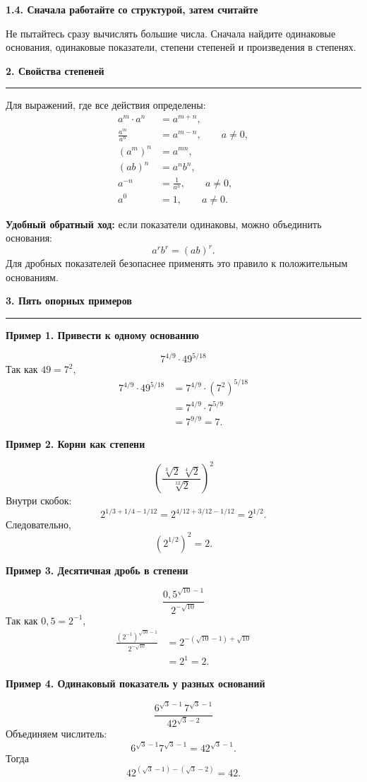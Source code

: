 \documentclass[a4paper,12pt]{article}
\newcommand{\sectionline}{\par\vspace{2pt}\noindent\color{rulegray}\rule{\linewidth}{0.5pt}\color{textgray}\par\vspace{5pt}}
\newcommand{\formula}[1]{\[\displaystyle #1\]}
\newcommand{\markrule}[1]{\textcolor{accent}{\textbf{#1}}}
\newcommand{\exhead}[1]{\par\medskip\textcolor{darkaccent}{\textbf{#1}}\par}
\begin{document}
\exhead{1.4. Сначала работайте со структурой, затем считайте}
Не пытайтесь сразу вычислять большие числа. Сначала найдите одинаковые основания, одинаковые показатели, степени степеней и произведения в степенях.

\vspace{5pt}
{\LARGE\bfseries\color{darkaccent}2. Свойства степеней}\par
\sectionline

Для выражений, где все действия определены:
\begin{align*}
a^m\cdot a^n&=a^{m+n},\\
\frac{a^m}{a^n}&=a^{m-n},\qquad a\ne 0,\\
(a^m)^n&=a^{mn},\\
(ab)^n&=a^n b^n,\\
a^{-n}&=\frac1{a^n},\qquad a\ne0,\\
a^0&=1,\qquad a\ne0.
\end{align*}

\markrule{Удобный обратный ход:} если показатели одинаковы, можно объединить основания:
\formula{a^r b^r=(ab)^r.}
Для дробных показателей безопаснее применять это правило к положительным основаниям.

{\LARGE\bfseries\color{darkaccent}3. Пять опорных примеров}\par
\sectionline

\exhead{Пример 1. Привести к одному основанию}
\formula{7^{4/9}\cdot49^{5/18}}
Так как $49=7^2$,
\begin{align*}
7^{4/9}\cdot49^{5/18}
&=7^{4/9}\cdot(7^2)^{5/18}\\
&=7^{4/9}\cdot7^{5/9}\\
&=7^{9/9}=7.
\end{align*}

\exhead{Пример 2. Корни как степени}
\formula{\left(\frac{\sqrt[3]{2}\,\sqrt[4]{2}}{\sqrt[12]{2}}\right)^2}
Внутри скобок:
\formula{2^{1/3+1/4-1/12}=2^{4/12+3/12-1/12}=2^{1/2}.}
Следовательно,
\formula{\left(2^{1/2}\right)^2=2.}

\exhead{Пример 3. Десятичная дробь в степени}
\formula{\frac{0{,}5^{\sqrt{10}-1}}{2^{-\sqrt{10}}}}
Так как $0{,}5=2^{-1}$,
\begin{align*}
\frac{(2^{-1})^{\sqrt{10}-1}}{2^{-\sqrt{10}}}
&=2^{-(\sqrt{10}-1)+\sqrt{10}}\\
&=2^1=2.
\end{align*}

\exhead{Пример 4. Одинаковый показатель у разных оснований}
\formula{\frac{6^{\sqrt3-1}\,7^{\sqrt3-1}}{42^{\sqrt3-2}}}
Объединяем числитель:
\formula{6^{\sqrt3-1}7^{\sqrt3-1}=42^{\sqrt3-1}.}
Тогда
\formula{42^{(\sqrt3-1)-(\sqrt3-2)}=42.}
\end{document}
